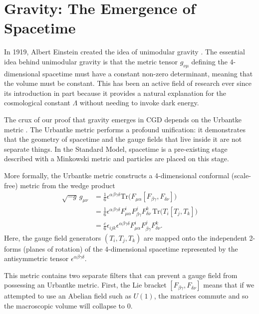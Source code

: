 
\section{Gravity: The Emergence of Spacetime}
\label{sec:Gravity}

In 1919, Albert Einstein created the idea of unimodular gravity \citep{weinberg1989cosmological}. The essential idea behind unimodular gravity is that the metric tensor $g_{\nu \mu}$ defining the 4-dimensional spacetime must have a constant non-zero determinant, meaning that the volume must be constant. This has been an active field of research ever since its introduction in part because it provides a natural explanation for the cosmological constant $\Lambda$ without needing to invoke dark energy.

The crux of our proof that gravity emerges in CGD depends on the Urbantke metric \citep{urbantke1984integrability}. The Urbantke metric performs a profound unification: it demonstrates that the geometry of spacetime and the gauge fields that live inside it are not separate things. In the Standard Model, spacetime is a pre-existing stage described with a Minkowski metric and particles are placed on this stage.

More formally, the Urbantke metric constructs a 4-dimensional conformal (scale-free) metric from the wedge product
\begin{align}
    \sqrt{-g} \, g_{\mu\nu}
    &= \frac{1}{6} \epsilon^{\alpha\beta\gamma\delta} \mathrm{Tr}\Big( F_{\mu\alpha} [F_{\beta\gamma}, F_{\delta\nu}] \Big) \nonumber \\
    &= \frac{1}{6} \epsilon^{\alpha\beta\gamma\delta} F_{\mu\alpha}^i F_{\beta\gamma}^j F_{\delta\nu}^k \, \mathrm{Tr}\Big( T_i [T_j, T_k] \Big) \nonumber \\
    &= \frac{c}{6} \epsilon_{ijk} \epsilon^{\alpha\beta\gamma\delta} F_{\mu\alpha}^i F_{\beta\gamma}^j F_{\delta\nu}^k .
\label{eq:urbantkeMetric}
\end{align}
\noindent Here, the gauge field generators $(T_i, T_j, T_k)$ are mapped onto the independent 2-forms (planes of rotation) of the 4-dimensional spacetime represented by the antisymmetric tensor $\epsilon^{\alpha\beta\gamma\delta}$.

This metric contains two separate filters that can prevent a gauge field from possessing an Urbantke metric. First, the Lie bracket $[F_{\beta\gamma}, F_{\delta\nu}]$ means that if we attempted to use an Abelian field such as $U(1)$, the matrices commute and so the macroscopic volume will collapse to 0.

